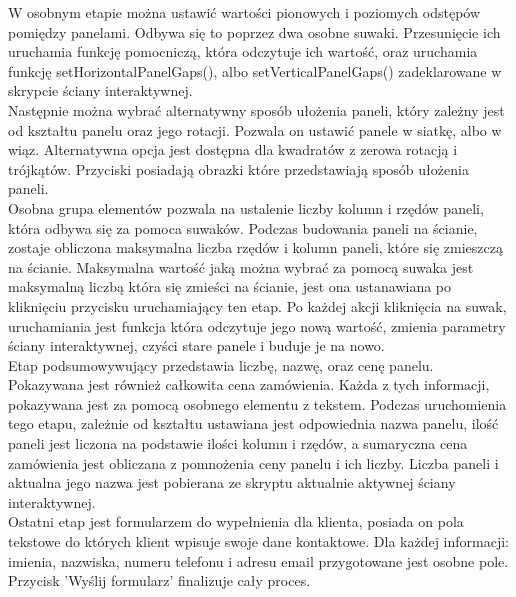 \documentclass{article} %
\begin{document}
            W osobnym etapie można ustawić wartości pionowych i poziomych odstępów pomiędzy panelami. Odbywa się to poprzez dwa osobne suwaki. Przesunięcie ich uruchamia funkcję pomocniczą, która odczytuje ich wartość, oraz uruchamia funkcję setHorizontalPanelGaps(), albo setVerticalPanelGaps() zadeklarowane w skrypcie ściany interaktywnej.
            \\
            
            Następnie można wybrać alternatywny sposób ułożenia paneli, który zależny jest od kształtu panelu oraz jego rotacji. Pozwala on ustawić panele w siatkę, albo w wiąz. Alternatywna opcja jest dostępna dla kwadratów z zerowa rotacją i trójkątów. Przyciski posiadają obrazki które przedstawiają sposób ułożenia paneli.
            \\
            
            Osobna grupa elementów pozwala na ustalenie liczby kolumn i rzędów paneli, która odbywa się za pomoca suwaków. Podczas budowania paneli na ścianie, zostaje obliczona maksymalna liczba rzędów i kolumn paneli, które się zmieszczą na ścianie. Maksymalna wartość jaką można wybrać za pomocą suwaka jest maksymalną liczbą która się zmieści na ścianie, jest ona ustanawiana po kliknięciu przycisku uruchamiający ten etap. Po każdej akcji kliknięcia na suwak, uruchamiania jest funkcja która odczytuje jego nową wartość, zmienia parametry ściany interaktywnej, czyści stare panele i buduje je na nowo.
            \\
            
            Etap podsumowywujący przedstawia liczbę, nazwę, oraz cenę panelu. Pokazywana jest również całkowita cena zamówienia. Każda z tych informacji, pokazywana jest za pomocą osobnego elementu z tekstem. Podczas uruchomienia tego etapu, zależnie od kształtu ustawiana jest odpowiednia nazwa panelu, ilość paneli jest liczona na podstawie ilości kolumn i rzędów, a sumaryczna cena zamówienia jest obliczana z pomnożenia ceny panelu i ich liczby. Liczba paneli i aktualna jego nazwa jest pobierana ze skryptu aktualnie aktywnej ściany interaktywnej.
            \\
            
            Ostatni etap jest formularzem do wypełnienia dla klienta, posiada on pola tekstowe do których klient wpisuje swoje dane kontaktowe. Dla każdej informacji: imienia, nazwiska, numeru telefonu i adresu email przygotowane jest osobne pole. Przycisk 'Wyślij formularz' finalizuje cały proces.
            \\
            
\end{document}

